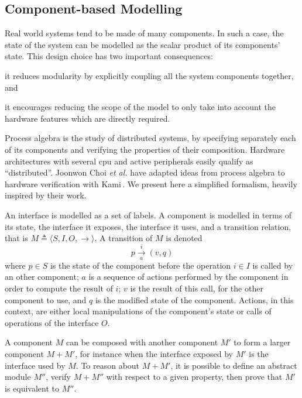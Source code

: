 \subsection{Component-based Modelling}
\label{subsec:related:ease:component}

Real world systems tend to be made of many components.
%
In such a case, the state of the system can be modelled as the scalar product of
its components' state.
%
This design choice has two important consequences:
%
\begin{inparaenum}[(1)]
%
\item it reduces modularity by explicitly coupling all the system components
  together, and
%
\item it encourages reducing the scope of the model to only take into account
  the hardware features which are directly required.
%
\end{inparaenum}

Process algebra is the study of distributed systems, by specifying separately
each of its components and verifying the properties of their composition.
%
Hardware architectures with several \ac{cpu} and active peripherals easily
qualify as ``distributed''.
%
Joonwon Choi \emph{et al.} have adapted ideas from process algebra to hardware
verification with Kami\,\cite{choi2017kami}.
%
We present here a simplified formalism, heavily inspired by their work.

An interface is modelled as a set of labels.
%
A component is modelled in terms of its state, the interface it exposes, the
interface it uses, and a transition relation, that is
$M \triangleq \langle S, I, O, \rightarrow \rangle$.
%
A transition of $M$ is denoted
%
\[ p \xrightarrow[a]{i} (v, q) \]
%
where $p \in S$ is the state of the component before the operation $i \in I$ is
called by an other component;
%
$a$ is a sequence of actions performed by the component in order to compute the
result of $i$;
%
$v$ is the result of this call, for the other component to use, and $q$ is the
modified state of the component.
%
Actions, in this context, are either local manipulations of the component's
state or calls of operations of the interface $O$.

A component $M$ can be composed with another component $M'$ to form a larger
component $M + M'$, for instance when the interface exposed by $M'$ is the
interface used by $M$.
%
To reason about $M + M'$, it is possible to define an abstract module $M''$,
verify $M + M''$ with respect to a given property, then prove that $M'$ is
equivalent to $M''$.

